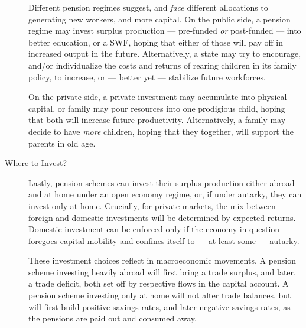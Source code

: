 \begin{description}
	Different pension regimes suggest, and \emph{face} different allocations to generating new workers, and more capital.
	On the public side, a pension regime may invest surplus production --- pre-funded \emph{or} post-funded --- into better education, or a \gls{SWF}, hoping that either of those will pay off in increased output in the future.
	Alternatively, a state may try to encourage, and/or individualize the costs and returns of rearing children in its family policy, to increase, or --- better yet --- stabilize future workforces.

	On the private side, a private investment may accumulate into physical capital, or family may pour resources into one prodigious child, hoping that both will increase future productivity.
	Alternatively, a family may decide to have \emph{more} children, hoping that they together, will support the parents in old age.

	\item[Where to Invest?] Lastly, pension schemes can invest their surplus production either abroad and at home under an open economy regime, or, if under autarky, they can invest only at home.
	Crucially, for private markets, the mix between foreign and domestic investments will be determined by expected returns.
	Domestic investment can be enforced only if the economy in question foregoes capital mobility and confines itself to --- at least some --- autarky.

	These investment choices reflect in macroeconomic movements.
	A pension scheme investing heavily abroad will first bring a trade surplus, and later, a trade deficit, both set off by respective flows in the capital account.
	A pension scheme investing only at home will not alter trade balances, but will first build positive savings rates, and later negative savings rates, as the pensions are paid out and consumed away.
\end{description}


